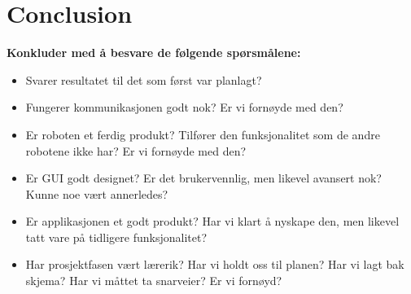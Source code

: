 \chapter{Conclusion}

\textbf{Konkluder med å besvare de følgende spørsmålene:}
\begin{itemize}
    \item Svarer resultatet til det som først var planlagt?
    \item Fungerer kommunikasjonen godt nok? Er vi fornøyde med den?
    \item Er roboten et ferdig produkt? Tilfører den funksjonalitet som de andre robotene ikke har? Er vi fornøyde med den?
    \item Er GUI godt designet? Er det brukervennlig, men likevel avansert nok? Kunne noe vært annerledes?
    \item Er applikasjonen et godt produkt? Har vi klart å nyskape den, men likevel tatt vare på tidligere funksjonalitet?
    \item Har prosjektfasen vært lærerik? Har vi holdt oss til planen? Har vi lagt bak skjema? Har vi måttet ta snarveier? Er vi fornøyd?
\end{itemize}